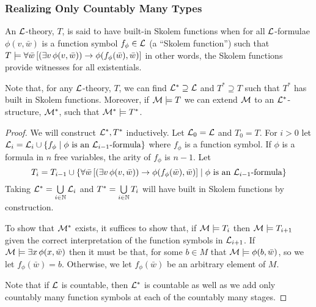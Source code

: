 \subsubsection{Realizing Only Countably Many Types}

\begin{definition}\label{definition_skolem_functions}
An \(\mathcal{L}\)-theory, \(T\), is said to have built-in Skolem functions when for all \(\mathcal{L}\)-formulae \(\phi(v, \bar{w})\) is a function symbol \(f_\phi \in \mathcal{L}\) (a ``Skolem function'') such that \(T \models \forall \bar{w} \left[(\exists v \, \phi(v, \bar{w})) \to \phi(f_\phi(\bar{w}), \bar{w})\right]\) in other words, the Skolem functions provide witnesses for all existentials. 
\end{definition}

\begin{theorem}\label{theorem_skolem_function_extension}
Note that, for any \(\mathcal{L}\)-theory, \(T\), we can find \(\mathcal{L}^* \supseteq \mathcal{L}\) and \(T^* \supseteq T\) such that \(T^*\) has built in Skolem functions. 
Moreover, if \(\mathcal{M} \models T\) we can extend \(\mathcal{M}\) to an \(\mathcal{L}^*\)-structure, \(\mathcal{M}^*\), such that \(\mathcal{M}^* \models T^*\). 
\end{theorem}

\begin{proof}
We will construct \(\mathcal{L}^*, T^*\) inductively. 
Let \(\mathcal{L}_0 = \mathcal{L}\) and \(T_0 = T\). 
For \(i > 0\) let \(\mathcal{L}_i = \mathcal{L}_i \cup \{f_\phi \mid \phi \text{ is an } \mathcal{L}_{i-1}\text{-formula}\}\) where \(f_\phi\) is a function symbol.
If \(\phi\) is a formula in \(n\) free variables, the arity of \(f_\phi\) is \(n-1\). 
Let \[T_i = T_{i-1} \cup \{\forall \bar{w} \left[(\exists v \, \phi(v, \bar{w})) \to \phi(f_\phi(\bar{w}), \bar{w})\right] \mid \phi \text{ is an } \mathcal{L}_{i-1}\text{-formula}\}\]
Taking \(\mathcal{L}^* = \bigcup\limits_{i \in \mathbb{N}} \mathcal{L}_i\) and \(T^* = \bigcup\limits_{i \in \mathbb{N}} T_i\) will have built in Skolem functions by construction.

To show that \(\mathcal{M}^*\) exists, it suffices to show that, if \(\mathcal{M} \models T_i\) then \(\mathcal{M} \models T_{i+1}\) given the correct interpretation of the function symbols in \(\mathcal{L}_{i+1}\).
If \(\mathcal{M} \models \exists x \, \phi(x, \bar{w})\) then it must be that, for some \(b \in M\) that \(\mathcal{M} \models \phi(b, \bar{w})\), so we let \(f_\phi(\bar{w}) = b\). 
Otherwise, we let \(f_\phi(\bar{w})\) be an arbitrary element of \(M\). 

Note that if \(\mathcal{L}\) is countable, then \(\mathcal{L}^*\) is countable as well as we add only countably many function symbols at each of the countably many stages.
\end{proof}

